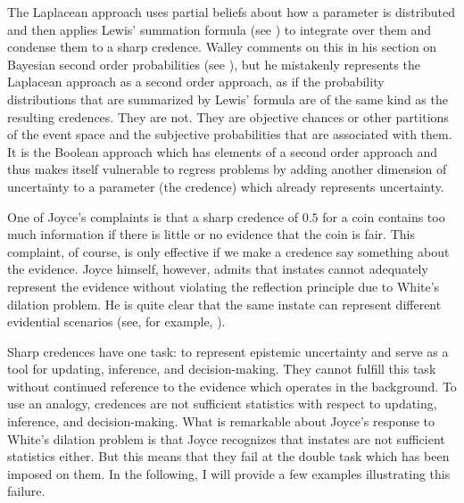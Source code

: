 \documentclass[11pt]{article}
\begin{document}
The Laplacean approach uses partial beliefs about how a parameter is
distributed and then applies Lewis' summation formula (see
) to integrate over them and condense them to
a sharp credence. Walley comments on this  in his
section on Bayesian second order probabilities (see
), but he mistakenly represents the Laplacean
approach as a second order approach, as if the probability
distributions that are summarized by Lewis' formula are of the same
kind as the resulting credences. They are not. They are objective
chances or other partitions of the event space and the subjective
probabilities that are associated with them. It is the Boolean
approach which has elements of a second order approach and thus makes
itself vulnerable to regress problems by adding another dimension of
uncertainty to a parameter (the credence) which already represents
uncertainty.

One of Joyce's complaints is that a sharp credence of $0.5$ for a coin
contains too much information if there is little or no evidence that
the coin is fair. This complaint, of course, is only effective if we
make a credence say something about the evidence. Joyce himself,
however, admits that instates cannot adequately represent the evidence
without violating the reflection principle due to White's dilation
problem. He is quite clear that the same instate can represent
different evidential scenarios (see, for example,
).

Sharp credences have one task: to represent epistemic uncertainty and
serve as a tool for updating, inference, and decision-making. They
cannot fulfill this task without continued reference to the evidence
which operates in the background. To use an analogy, credences are not
sufficient statistics with respect to updating, inference, and
decision-making. What is remarkable about Joyce's response to White's
dilation problem is that Joyce recognizes that instates are not
sufficient statistics either. But this means that they fail at the
double task which has been imposed on them. In the following, I will
provide a few examples illustrating this failure.

\end{document}
